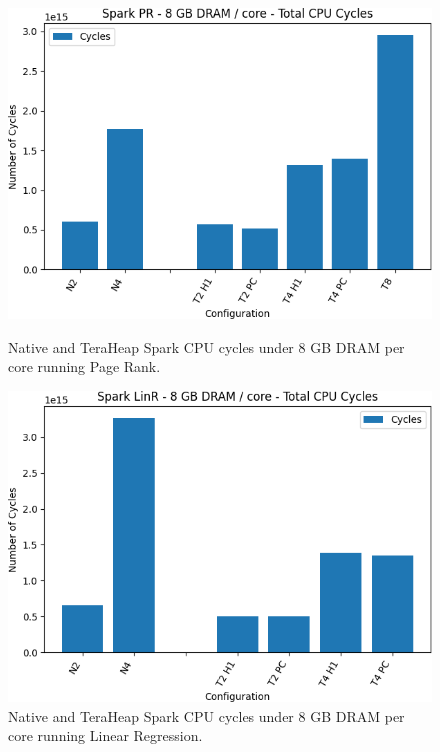 \begin{figure}[thbp]
        \centering
        \includegraphics[width=\linewidth]{./fig/pr64_cycles.png}
    \caption{Native and TeraHeap Spark CPU cycles under 8 GB DRAM per core running Page Rank.}
\label{fig:pr64_cycles}
        \includegraphics[width=\linewidth]{./fig/linr64_cycles.png}
    \caption{Native and TeraHeap Spark CPU cycles under 8 GB DRAM per core running Linear Regression.}
                \label{fig:linr64_cycles}
\end{figure}

